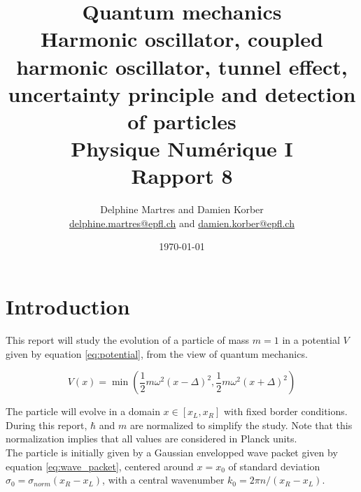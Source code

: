 \documentclass[a4paper,12pt,twoside]{article}
\newcommand{\mail}[1]{{\href{mailto:#1}{#1}}}
\newcommand{\bracket}[1]{\left(#1\right)}
\newcommand{\sqbracket}[1]{\left[#1\right]}
\begin{document}
\title{Quantum mechanics\\{\normalsize Harmonic oscillator, coupled harmonic oscillator, tunnel effect, uncertainty principle and detection of particles}\\{\small Physique Numérique I}\\{\small Rapport 8}}
\date{\today}
\author{Delphine Martres and Damien Korber\\{\small \mail{delphine.martres@epfl.ch} and \mail{damien.korber@epfl.ch}}}

\maketitle
\tableofcontents %


\baselineskip=16pt
\parindent=15pt
\parskip=5pt
\newpage


\section{Introduction}
  This report will study the evolution of a particle of mass $m=1$ in a potential $V$ given by equation \eqref{eq:potential}, from the view of quantum mechanics.

  \begin{equation}
    V(x) = \min\bracket{\frac{1}{2}m\omega^2(x-\Delta)^2, \frac{1}{2}m\omega^2(x+\Delta)^2}
    \label{eq:potential}
  \end{equation}

  The particle will evolve in a domain $x\in\sqbracket{x_L, x_R}$ with fixed border conditions.
  During this report, $\hbar$ and $m$ are normalized to simplify the study.
  Note that this normalization implies that all values are considered in Planck units.\\

  The particle is initially given by a Gaussian envelopped wave packet given by equation \eqref{eq:wave_packet}, centered around $x=x_0$ of standard deviation $\sigma_0 = \sigma_{norm}(x_R - x_L)$, with a central wavenumber $k_0 = 2\pi n/(x_R - x_L)$.
\end{document}
